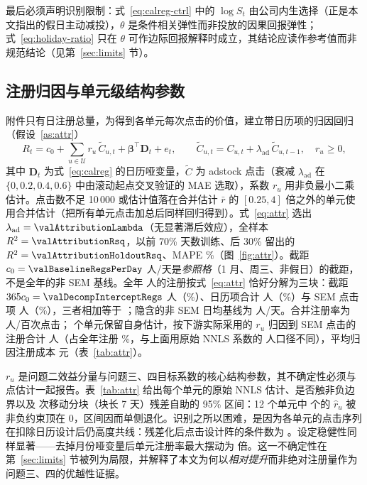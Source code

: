 最后必须声明识别限制：式~\eqref{eq:calreg-ctrl} 中的 $\log S_t$ 由公司内生选择（正是本文指出的假日主动减投），$\theta$ 是条件相关弹性而非投放的因果回报弹性；式~\eqref{eq:holiday-ratio} 只在 $\theta$ 可作边际回报解释时成立，其结论应读作参考值而非规范结论（见第~\ref{sec:limits} 节）。

\subsection{注册归因与单元级结构参数}
\label{sec:q1attr}
附件只有日注册总量，为得到各单元每次点击的价值，建立带日历项的归因回归（假设~\ref{as:attr}）
\begin{equation}\label{eq:attr}
R_t=c_0+\sum_{u\in\mathcal U} r_u\,\tilde C_{u,t}+\bm\beta^{\top}\bm D_t+e_t,\qquad
\tilde C_{u,t}=C_{u,t}+\lambda_{\mathrm{ad}}\,\tilde C_{u,t-1},\quad r_u\ge 0,
\end{equation}
其中 $\bm D_t$ 为式~\eqref{eq:calreg} 的日历哑变量，$\tilde C$ 为 adstock 点击（衰减 $\lambda_{\mathrm{ad}}$ 在 $\{0,0.2,0.4,0.6\}$ 中由滚动起点交叉验证的 MAE 选取），系数 $r_u$ 用非负最小二乘\cite{lawson1995}估计。点击数不足 10\,000 或估计值落在合并估计 $\bar r$ 的 $[0.25,4]$ 倍之外的单元使用合并估计（把所有单元点击加总后同样回归得到）。式~\eqref{eq:attr} 选出 $\lambda_{\mathrm{ad}}=\valAttributionLambda$（无显著滞后效应），全样本 $R^2=\valAttributionRsq$，以前 70\% 天数训练、后 30\% 留出的 $R^2=\valAttributionHoldoutRsq$、MAPE \valAttributionHoldoutMape\%（图~\ref{fig:attr}）。截距 $c_0=\valBaselineRegsPerDay$ 人/天是\emph{参照格}（1 月、周三、非假日）的截距，不是全年的非 SEM 基线。全年 \valTotalRegs{} 人的注册按式~\eqref{eq:attr} 恰好分解为三块：截距 $365c_0=\valDecompInterceptRegs$ 人（\valDecompInterceptPct\%）、日历项合计 \valDecompCalendarRegs{} 人（\valDecompCalendarPct\%）与 SEM 点击项 \valDecompSemRegs{} 人（\valDecompSemPct\%），三者相加等于 \valTotalRegs；隐含的非 SEM 日均基线为 \valDecompNonSemPerDay{} 人/天。合并注册率为 \valPooledRegRatePerHundredClicks{} 人/百次点击；\valUnitsWithOwnRate{} 个单元保留自身估计，按下游实际采用的 $r_u$ 归因到 SEM 点击的注册合计 \valAttributedRegs{} 人（占全年注册 \valAttributedRegsSharePct\%，与上面用原始 NNLS 系数的 \valDecompSemRegs{} 人口径不同），平均归因注册成本 \valCostPerAttributedReg{} 元（表~\ref{tab:attr}）。

$r_u$ 是问题二效益分量与问题三、四目标系数的核心结构参数，其不确定性必须与点估计一起报告。表~\ref{tab:attr} 给出每个单元的原始 NNLS 估计、是否触非负边界以及 \valAttributionBoot{} 次移动分块（块长 7 天）残差自助的 95\% 区间：12 个单元中 \valAttributionZeroBoundUnits{} 个的 $\hat r_u$ 被非负约束顶在 0，区间因而单侧退化。识别之所以困难，是因为各单元的点击序列在扣除日历设计后仍高度共线：残差化后点击设计阵的条件数为 \valAttributionConditionNumber。设定稳健性同样显著——去掉月份哑变量后单元注册率最大摆动为 \valAttributionMaxSwingRatio{} 倍。这一不确定性在第~\ref{sec:limits} 节被列为局限，并解释了本文为何以\emph{相对提升}而非绝对注册量作为问题三、四的优越性证据。

